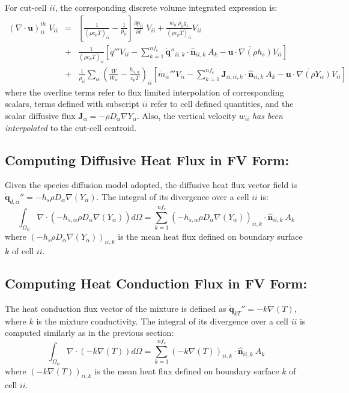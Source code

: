 For cut-cell $ii$, the corresponding discrete volume integrated expression is:
%
\begin{eqnarray}
    ( \nabla \cdot \mathbf{u} )_{ii}^{th} \; V_{ii} &=&
    \left[ \frac{1}{(\rho c_p T)_{ii}} - \frac{1}{\bar{p}_{ii}} \right]
    \frac{\partial \bar{p}_{ii}}{\partial t} \; V_{ii} +
    \frac{w_{ii} \: \rho_0 g_z}{(\rho c_p T)_{ii}} V_{ii} \nonumber \\
    &+& \frac{1}{(\rho c_p T)_{ii}} \left[ \dot{q}''' V_{ii} -
    \sum_{k=1}^{nf_c} \dot{\mathbf{q}}''_{ii,k} \cdot \hat{\mathbf{n}}_{ii,k} \: A_k
    - \overline{\mathbf{u} \cdot \nabla (\rho h_s)} V_{ii} \right] \nonumber \\
    &+& \frac{1}{\rho_{ii}} \sum_\alpha \left( \frac{\overline{W}}{W_\alpha} - \frac{h_{s,\alpha}}{c_p T} \right)_{ii} \left[ \dot{m}_\alpha''' V_{ii} -
    \sum_{k=1}^{nf_c} \mathbf{J}_{\alpha,ii,k} \cdot \hat{\mathbf{n}}_{ii,k} \: A_k
    - \overline{\mathbf{u} \cdot \nabla (\rho Y_\alpha)} V_{ii} \right] \label{eq:divth2}
\end{eqnarray}
%
where the overline terms refer to flux limited interpolation of corresponding scalars, terms defined with subscript $ii$ refer to cell defined quantities, and the scalar diffusive flux $\mathbf{J}_\alpha=- \rho D_\alpha \nabla Y_\alpha$. Also, the vertical velocity $w_{ii}$ \textit{has been interpolated} to the cut-cell centroid.

\subsection{Computing Diffusive Heat Flux in FV Form:}

Given the species diffusion model adopted, the diffusive heat flux vector field is $\dot{\mathbf{q}}_{d,\alpha}''=-h_s \rho D_\alpha \nabla(Y_\alpha)$. The integral of its divergence over a cell $ii$ is:
\begin{equation}
    \int_{\Omega_{ii}} {\nabla \cdot \left(-h_{s,\alpha} \rho D_\alpha \nabla(Y_\alpha) \right)} d\Omega = \sum_{k=1}^{nf_c} \left(-h_{s,\alpha} \rho D_\alpha \nabla(Y_\alpha) \right)_{ii,k} \cdot \hat{\mathbf{n}}_{ii,k}  \: A_k
\end{equation}
where $\left(-h_s \rho D_\alpha \nabla(Y_\alpha) \right)_{ii,k}$ is the mean heat flux defined on boundary surface $k$ of cell $ii$.


\subsection{Computing Heat Conduction Flux in FV Form:}


The heat conduction flux vector of the mixture is defined as $\dot{\mathbf{q}}_{kT}''= -k \nabla(T)$, where $k$ is the mixture conductivity. The integral of its divergence over a cell $ii$ is computed similarly as in the previous section:
\begin{equation}
    \int_{\Omega_{ii}} {\nabla \cdot \left(-k \nabla(T)\right)} d\Omega = \sum_{k=1}^{nf_c} \left(-k \nabla(T) \right)_{ii,k} \cdot \hat{\mathbf{n}}_{ii,k}  \: A_k
\end{equation}
where $\left(-k \nabla(T) \right)_{ii,k}$ is the mean heat flux defined on boundary surface $k$ of cell $ii$.


